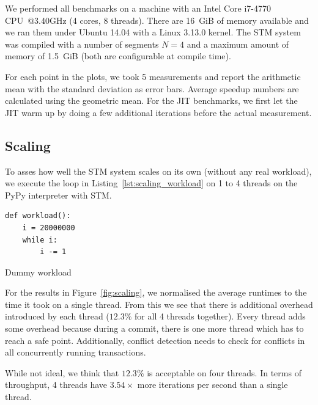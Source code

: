 \documentclass{sigplanconf}
\begin{document}
We performed all benchmarks on a machine with an Intel Core i7-4770
CPU~@3.40GHz (4 cores, 8 threads).  There are 16~GiB of memory
available and we ran them under Ubuntu 14.04 with a Linux 3.13.0
kernel. The STM system was compiled with a number of segments $N=4$
and a maximum amount of memory of 1.5~GiB (both are configurable at
compile time).

For each point in the plots, we took 5 measurements and report the
arithmetic mean with the standard deviation as error bars. Average
speedup numbers are calculated using the geometric mean. For the JIT
benchmarks, we first let the JIT warm up by doing a few additional
iterations before the actual measurement.



\subsection{Scaling}

To asses how well the STM system scales on its own (without any real
workload), we execute the loop in Listing~\ref{lst:scaling_workload}
on 1 to 4 threads on the PyPy interpreter with STM.

\begin{code}[h]
\begin{lstlisting}
def workload():
    i = 20000000
    while i:
        i -= 1
\end{lstlisting}
\caption{Dummy workload\label{lst:scaling_workload}}
\end{code}

For the results in Figure~\ref{fig:scaling}, we
normalised the average runtimes to the time it took on a single
thread. From this we see that there is additional overhead introduced
by each thread ($12.3\%$ for all 4 threads together). Every thread
adds some overhead because during a commit, there is one more thread
which has to reach a safe point. Additionally, conflict detection
needs to check for conflicts in all concurrently running transactions.

While not ideal, we think that $12.3\%$ is acceptable on four
threads. In terms of throughput, 4 threads have $3.54\times$
more iterations per second than a single thread.
\end{document}
